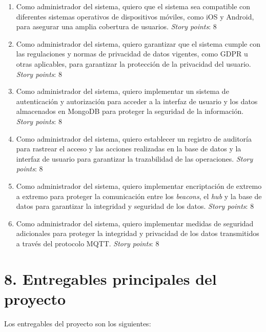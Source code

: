 \documentclass[
11pt, %
]{charter}
\begin{document}
\begin{enumerate}
	\item Como administrador del sistema, quiero que el sistema sea compatible con diferentes sistemas operativos de dispositivos móviles, como iOS y Android, para asegurar una amplia cobertura de usuarios. \textit{Story points}: 8
	\item Como administrador del sistema, quiero garantizar que el sistema cumple con las regulaciones y normas de privacidad de datos vigentes, como GDPR u otras aplicables, para garantizar la protección de la privacidad del usuario. \textit{Story points}: 8
	\item Como administrador del sistema, quiero implementar un sistema de autenticación y autorización para acceder a la interfaz de usuario y los datos almacenados en MongoDB para proteger la seguridad de la información. \textit{Story points}: 8
	\item Como administrador del sistema, quiero establecer un registro de auditoría para rastrear el acceso y las acciones realizadas en la base de datos y la interfaz de usuario para garantizar la trazabilidad de las operaciones. \textit{Story points}: 8
	\item Como administrador del sistema, quiero implementar encriptación de extremo a extremo para proteger la comunicación entre los \textit{beacons}, el \textit{hub} y la base de datos para garantizar la integridad y seguridad de los datos. \textit{Story points}: 8
	\item Como administrador del sistema, quiero implementar medidas de seguridad adicionales para proteger la integridad y privacidad de los datos transmitidos a través del protocolo MQTT. \textit{Story points}: 8
\end{enumerate}

\section{8. Entregables principales del proyecto}
\label{sec:entregables}

Los entregables del proyecto son los siguientes:
\end{document}
